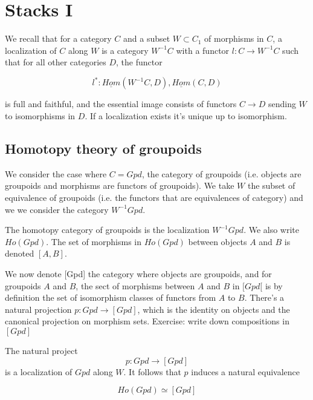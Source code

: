 \documentclass[../main.tex]{subfiles}
\begin{document}
\setcounter{chapter}{5}

\chapter{Stacks I}

We recall that for a category $C$ and a subset $W \subset C_1$ of morphisms in $C$, a localization of $C$ along $W$ is a category $W^{-1}C$ with a functor $l: C \to W^{-1}C$ such that for all other categories $D$, the functor

\[
l^*: \underline{Hom}(W^{-1}C, D),  \underline{Hom}(C, D)
\]

is full and faithful, and the essential image consists of functors $C \to D$ sending $W$ to isomorphisms in $D$. If a localization exists it's unique up to isomorphism.


\section{Homotopy theory of groupoids}

We consider the case where $C = Gpd$, the category of groupoids (i.e. objects are groupoids and morphisms are functors of groupoids). We take $W$ the subset of equivalence of groupoids (i.e. the functors that are equivalences of category) and we we consider the category $W^{-1}Gpd$.

\begin{defn}
    The homotopy category of groupoids is the localization $W^{-1}Gpd$. We also write $Ho(Gpd)$. The set of morphisms in $Ho(Gpd)$ between objects $A$ and $B$ is denoted $[A, B]$.
\end{defn}

We now denote [Gpd] the category where objects are groupoids, and for groupoids $A$ and $B$, the sect of morphisms between $A$ and $B$ in $[Gpd[$ is by definition the set of isomorphism classes of functors from $A$ to $B$. There's a natural projection $p: Gpd \to [Gpd]$, which is the identity on objects and the canonical projection on morphism sets. Exercise: write down compositions in $[Gpd]$


\begin{thm}
    The natural project
    \[
        p: Gpd \to [Gpd]
    \]
    is a localization of $Gpd$ along $W$. It follows that $p$ induces a natural equivalence

    \[
        Ho(Gpd) \simeq [Gpd]
    \]

\end{thm}
\end{document}
